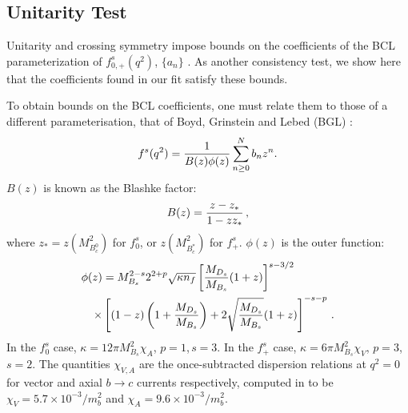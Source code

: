 \FloatBarrier

\subsection{Unitarity Test}

Unitarity and crossing symmetry impose bounds on the coefficients of the BCL parameterization of $f^s_{0,+}(q^2)$, $\{a_n\}$ \cite{PhysRevD.4.725,PhysRevD.3.2807}. As another consistency test, we show here that the coefficients found in our fit satisfy these bounds.

To obtain bounds on the BCL coefficients, one must relate them to those of a different parameterisation, that of Boyd, Grinstein and Lebed (BGL) \cite{GLENNBOYD1996493}:
\begin{align}
  f^s(q^2) = {1\over B(z)\phi(z)} \sum^N_{n\geq 0} b_n z^n.
\end{align}
$B(z)$ is known as the Blashke factor:
\begin{align}
  B(z) = { z - z_* \over 1 - z z_* }\,,
\end{align}
where $z_* = z(M^2_{B_c^0})$ for $f_0^s$, or $z(M^2_{B_c^*})$ for $f_+^s$. $\phi(z)$ is the outer function:
\begin{align}
  \phi(z) &= M_{B_s}^{2-s} 2^{2+p} \sqrt{\kappa n_f}
  \left[ {M_{D_s}\over M_{B_s}} (1+z)\right]^{s-3/2} \nonumber \\
  \times &\left[ (1-z)\left(1+{M_{D_s}\over M_{B_s}}\right)+2\sqrt{M_{D_s}\over M_{B_s}}(1+z)\right]^{-s-p}\,.
\end{align}
In the $f^s_0$ case, $\kappa=12\pi M^2_{B_s}\chi_A$, $p=1$,\,$s=3$. In the $f^s_+$ case, $\kappa=6\pi M^2_{B_s} \chi_V$, $p=3$,\,$s=2$. The quantities $\chi_{V,A}$ are the once-subtracted dispersion relations at $q^2=0$ for vector and axial $b\to c$ currents respectively, computed in \cite{GLENNBOYD1996493} to be $\chi_V = 5.7\times 10^{-3}/m_b^2$ and $\chi_A = 9.6\times 10^{-3}/m_b^2$.

